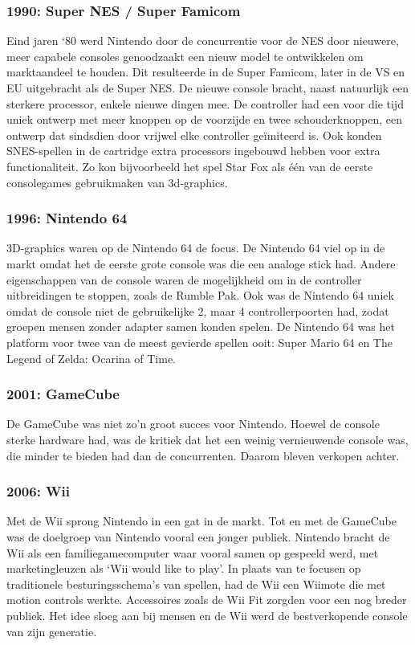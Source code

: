 \documentclass{article}
\begin{document}
\subsubsection{1990: Super NES / Super Famicom}
Eind jaren `80 werd Nintendo door de concurrentie voor de NES door nieuwere, meer capabele consoles genoodzaakt een nieuw model te ontwikkelen om marktaandeel te houden. Dit resulteerde in de Super Famicom, later in de VS en EU uitgebracht als de Super NES. 
De nieuwe console bracht, naast natuurlijk een sterkere processor, enkele nieuwe dingen mee. De controller had een voor die tijd uniek ontwerp met meer knoppen op de voorzijde en twee schouderknoppen, een ontwerp dat sindsdien door vrijwel elke controller geïmiteerd is.
Ook konden SNES-spellen in de cartridge extra processors ingebouwd hebben voor extra functionaliteit. Zo kon bijvoorbeeld het spel Star Fox als \'e\'en van de eerste consolegames gebruikmaken van 3d-graphics.


\subsubsection{1996: Nintendo 64}
3D-graphics waren op de Nintendo 64 de focus. De Nintendo 64 viel op in de markt omdat het de eerste grote console was die een analoge stick had. Andere eigenschappen van de console waren de mogelijkheid om in de controller uitbreidingen te stoppen, zoals de Rumble Pak. Ook was de Nintendo 64 uniek omdat de console niet de gebruikelijke 2, maar 4 controllerpoorten had, zodat groepen mensen zonder adapter samen konden spelen. De Nintendo 64 was het platform voor twee van de meest gevierde spellen ooit: Super Mario 64 en The Legend of Zelda: Ocarina of Time. 

\subsubsection{2001: GameCube}
De GameCube was niet zo'n groot succes voor Nintendo. Hoewel de console sterke hardware had, was de kritiek dat het een weinig vernieuwende console was, die minder te bieden had dan de concurrenten. Daarom bleven verkopen achter. 


\subsubsection{2006: Wii}
Met de Wii sprong Nintendo in een gat in de markt. Tot en met de GameCube was de doelgroep van Nintendo vooral een jonger publiek. Nintendo bracht de Wii als een familiegamecomputer waar vooral samen op gespeeld werd, met marketingleuzen als `Wii would like to play'. In plaats van te focusen op traditionele besturingsschema's van spellen, had de Wii een Wiimote die met motion controls werkte. Accessoires zoals de Wii Fit zorgden voor een nog breder publiek. Het idee sloeg aan bij mensen en de Wii werd de bestverkopende console van zijn generatie.
\end{document}
